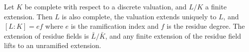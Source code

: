 Let $K$ be complete with respect to a discrete valuation, and $L/K$ a finite extension. Then $L$ is also complete, the valuation extends uniquely to $L$, and $[L:K] = ef$ where $e$ is the ramification index and $f$ is the residue degree. The extension of residue fields is $\bar{L}/\bar{K}$, and any finite extension of the residue field lifts to an unramified extension.

